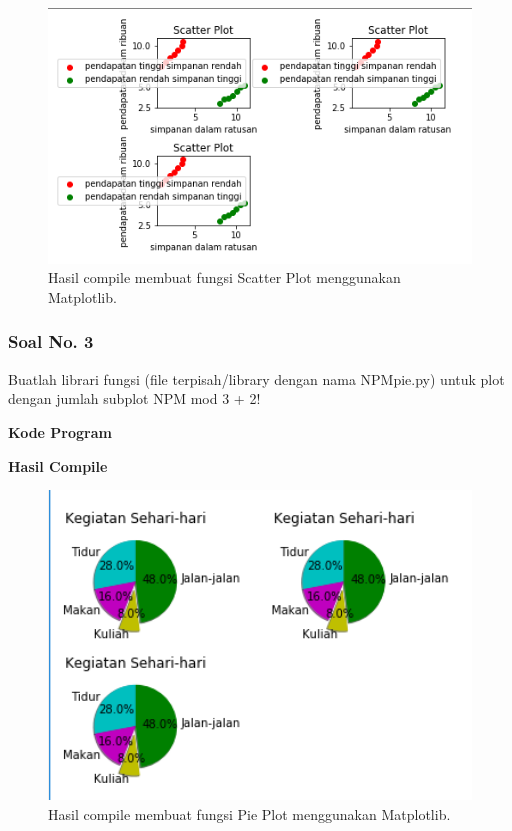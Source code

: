 \begin{figure}[H]
	\includegraphics[width=12cm]{figures/6/1174089/Praktek/p2.png}
	\centering
	\caption{Hasil compile membuat fungsi Scatter Plot menggunakan Matplotlib.}
\end{figure}

\subsubsection{Soal No. 3}
\hfill \break
Buatlah librari fungsi (file terpisah/library dengan nama NPMpie.py) untuk plot dengan jumlah subplot NPM mod 3 + 2!

\hfill \break
\textbf{Kode Program}



\hfill \break
\textbf{Hasil Compile}

\begin{figure}[H]
	\includegraphics[width=12cm]{figures/6/1174089/Praktek/p3.png}
	\centering
	\caption{Hasil compile membuat fungsi Pie Plot menggunakan Matplotlib.}
\end{figure}

